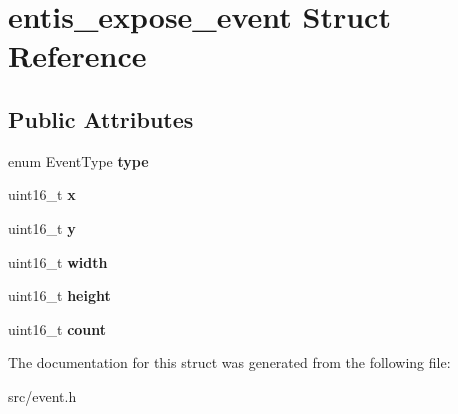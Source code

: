 \hypertarget{structentis__expose__event}{}\section{entis\+\_\+expose\+\_\+event Struct Reference}
\label{structentis__expose__event}
\subsection*{Public Attributes}
\begin{DoxyCompactItemize}
\item 
\mbox{\label{structentis__expose__event_a6a17e29fd76012a767c3c08d2785dbbc}} 
enum Event\+Type {\bfseries type}
\item 
\mbox{\label{structentis__expose__event_afd7b58a073125b967b3aa3fdf2747284}} 
uint16\+\_\+t {\bfseries x}
\item 
\mbox{\label{structentis__expose__event_a5248e59eeb1496c28ae95397d57c8eb6}} 
uint16\+\_\+t {\bfseries y}
\item 
\mbox{\label{structentis__expose__event_a23501fe4563c87552add40a608adf816}} 
uint16\+\_\+t {\bfseries width}
\item 
\mbox{\label{structentis__expose__event_aa2120f5345c19d7569708deeb059b22d}} 
uint16\+\_\+t {\bfseries height}
\item 
\mbox{\label{structentis__expose__event_af1fa9b9400734a86f52fc78bb6fcd5f8}} 
uint16\+\_\+t {\bfseries count}
\end{DoxyCompactItemize}


The documentation for this struct was generated from the following file\+:\begin{DoxyCompactItemize}
\item 
src/event.\+h\end{DoxyCompactItemize}

